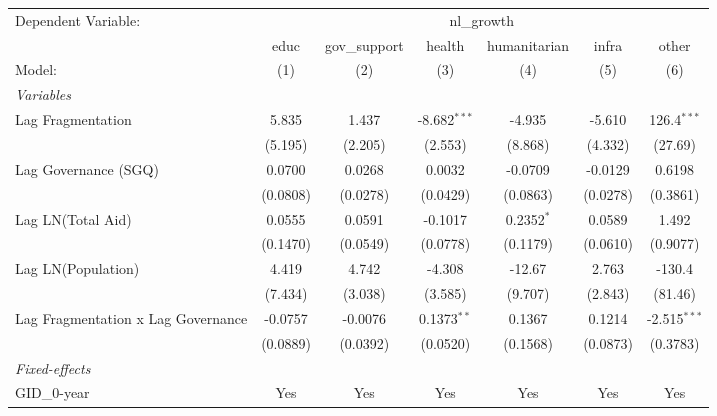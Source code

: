 \par\endgroup



\begingroup
\centering
\begin{tabular}{lcccccc}
   \tabularnewline \midrule \midrule
   Dependent Variable: & \multicolumn{6}{c}{nl\_growth}\\
                                      & educ     & gov\_support  & health         & humanitarian & infra    & other \\   
   Model:                             & (1)      & (2)           & (3)            & (4)          & (5)      & (6)\\  
   \midrule
   \emph{Variables}\\
   Lag Fragmentation                  & 5.835    & 1.437         & -8.682$^{***}$ & -4.935       & -5.610   & 126.4$^{***}$\\   
                                      & (5.195)  & (2.205)       & (2.553)        & (8.868)      & (4.332)  & (27.69)\\   
   Lag Governance (SGQ)               & 0.0700   & 0.0268        & 0.0032         & -0.0709      & -0.0129  & 0.6198\\   
                                      & (0.0808) & (0.0278)      & (0.0429)       & (0.0863)     & (0.0278) & (0.3861)\\   
   Lag LN(Total Aid)                  & 0.0555   & 0.0591        & -0.1017        & 0.2352$^{*}$ & 0.0589   & 1.492\\   
                                      & (0.1470) & (0.0549)      & (0.0778)       & (0.1179)     & (0.0610) & (0.9077)\\   
   Lag LN(Population)                 & 4.419    & 4.742         & -4.308         & -12.67       & 2.763    & -130.4\\   
                                      & (7.434)  & (3.038)       & (3.585)        & (9.707)      & (2.843)  & (81.46)\\   
   Lag Fragmentation x Lag Governance & -0.0757  & -0.0076       & 0.1373$^{**}$  & 0.1367       & 0.1214   & -2.515$^{***}$\\   
                                      & (0.0889) & (0.0392)      & (0.0520)       & (0.1568)     & (0.0873) & (0.3783)\\   
   \midrule
   \emph{Fixed-effects}\\
   GID\_0-year                        & Yes      & Yes           & Yes            & Yes          & Yes      & Yes\\  

\end{tabular}
